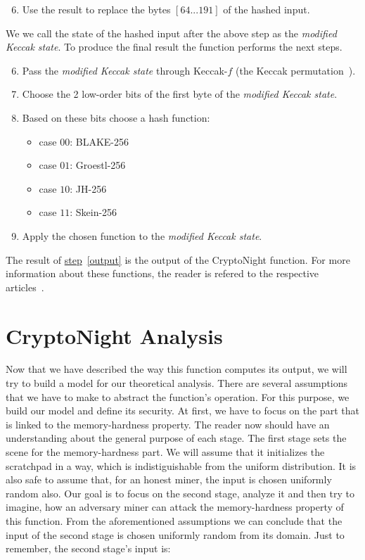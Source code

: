 \begin{enumerate}
  \setcounter{enumi}{5}
  \item \label{modified} Use the result to replace the bytes $[64...191]$ of the hashed input.
\end{enumerate}
We we call the state of the hashed input after the above step as the \emph{modified Keccak state}. To produce the final result the function performs the next steps.

\begin{enumerate}
  \setcounter{enumi}{5}
  \item Pass the \emph{modified Keccak state} through Keccak-$f$ (the Keccak permutation~\cite{keccak}).
  \item Choose the 2 low-order bits of the first byte of the \emph{modified Keccak state}.
  \item Based on these bits choose a hash function:
  \begin{itemize}
    \item case $00$: BLAKE-256
    \item case $01$: Groestl-256
    \item case $10$: JH-256
    \item case $11$: Skein-256
  \end{itemize}
  \item \label{output} Apply the chosen function to the \emph{modified Keccak state}.
\end{enumerate}
The result of \hyperref[output]{step}~\ref{output} is the output of the CryptoNight function. For more information about these functions, the reader is refered to the respective articles~\cite{10030667226,sha3groestl,sha3W09,sha3F+08}.

\section{CryptoNight Analysis}
Now that we have described the way this function computes its output, we will try to build a model for our theoretical analysis. There are several assumptions that we have to make to abstract the function's operation. For this purpose, we build our model and define its security. At first, we have to focus on the part that is linked to the memory-hardness property. The reader now should have an understanding about the general purpose of each stage. The first stage sets the scene for the memory-hardness part. We will assume that it initializes the scratchpad in a way, which is indistiguishable from the uniform distribution. It is also safe to assume that, for an honest miner, the input is chosen uniformly random also. Our goal is to focus on the second stage, analyze it and then try to imagine, how an adversary miner can attack the memory-hardness property of this function. From the aforementioned assumptions we can conclude that the input of the second stage is chosen uniformly random from its domain. Just to remember, the second stage's input is:

